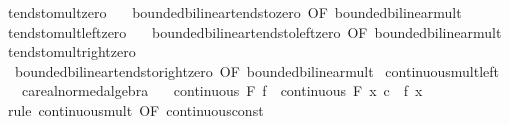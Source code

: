 \begin{isabellebody}
\isanewline
{}\isamarkupfalse%
\ tendsto{\isacharunderscore}{\kern0pt}mult{\isacharunderscore}{\kern0pt}zero\ {\isacharequal}{\kern0pt}\isanewline
\ \ bounded{\isacharunderscore}{\kern0pt}bilinear{\isachardot}{\kern0pt}tendsto{\isacharunderscore}{\kern0pt}zero\ {\isacharbrackleft}{\kern0pt}OF\ bounded{\isacharunderscore}{\kern0pt}bilinear{\isacharunderscore}{\kern0pt}mult{\isacharbrackright}{\kern0pt}\isanewline
\isanewline
{}\isamarkupfalse%
\ tendsto{\isacharunderscore}{\kern0pt}mult{\isacharunderscore}{\kern0pt}left{\isacharunderscore}{\kern0pt}zero\ {\isacharequal}{\kern0pt}\isanewline
\ \ bounded{\isacharunderscore}{\kern0pt}bilinear{\isachardot}{\kern0pt}tendsto{\isacharunderscore}{\kern0pt}left{\isacharunderscore}{\kern0pt}zero\ {\isacharbrackleft}{\kern0pt}OF\ bounded{\isacharunderscore}{\kern0pt}bilinear{\isacharunderscore}{\kern0pt}mult{\isacharbrackright}{\kern0pt}\isanewline
\isanewline
{}\isamarkupfalse%
\ tendsto{\isacharunderscore}{\kern0pt}mult{\isacharunderscore}{\kern0pt}right{\isacharunderscore}{\kern0pt}zero\ {\isacharequal}{\kern0pt}\isanewline
\ \ bounded{\isacharunderscore}{\kern0pt}bilinear{\isachardot}{\kern0pt}tendsto{\isacharunderscore}{\kern0pt}right{\isacharunderscore}{\kern0pt}zero\ {\isacharbrackleft}{\kern0pt}OF\ bounded{\isacharunderscore}{\kern0pt}bilinear{\isacharunderscore}{\kern0pt}mult{\isacharbrackright}{\kern0pt}\isanewline
\isanewline
\isanewline
{}\isamarkupfalse%
\ continuous{\isacharunderscore}{\kern0pt}mult{\isacharunderscore}{\kern0pt}left{\isacharcolon}{\kern0pt}\isanewline
\ \ \ c{\isacharcolon}{\kern0pt}{\isacharcolon}{\kern0pt}{\isachardoublequoteopen}{\isacharprime}{\kern0pt}a{\isacharcolon}{\kern0pt}{\isacharcolon}{\kern0pt}real{\isacharunderscore}{\kern0pt}normed{\isacharunderscore}{\kern0pt}algebra{\isachardoublequoteclose}\isanewline
\ \ \ {\isachardoublequoteopen}continuous\ F\ f\ {\isasymLongrightarrow}\ continuous\ F\ {\isacharparenleft}{\kern0pt}{\isasymlambda}x{\isachardot}{\kern0pt}\ c\ {\isacharasterisk}{\kern0pt}\ f\ x{\isacharparenright}{\kern0pt}{\isachardoublequoteclose}\isanewline
%
\isadelimproof
%
\endisadelimproof
%
\isatagproof
{}\isamarkupfalse%
\ {\isacharparenleft}{\kern0pt}rule\ continuous{\isacharunderscore}{\kern0pt}mult\ {\isacharbrackleft}{\kern0pt}OF\ continuous{\isacharunderscore}{\kern0pt}const{\isacharbrackright}{\kern0pt}{\isacharparenright}{\kern0pt}%
\endisatagproof
{\isafoldproof}%
%
\isadelimproof
\isanewline
%
\endisadelimproof
\isanewline
{}\isamarkupfalse%

\end{isabellebody}
